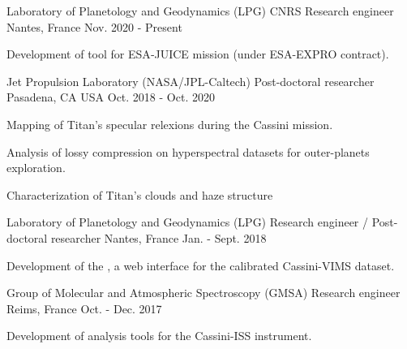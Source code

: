 
\begin{cventries}

  \cventry
  {Laboratory of Planetology and Geodynamics (LPG)}
  {CNRS Research engineer}
  {Nantes, France}
  {Nov. 2020 - Present}
  {
    \begin{cvitems}
      \item{Development of  tool for ESA‑JUICE mission (under ESA-EXPRO contract).}
    \end{cvitems}
    \vspace{1em}
  }

  \cventry
    {Jet Propulsion Laboratory (NASA/JPL-Caltech)}
    {Post-doctoral researcher}
    {Pasadena, CA USA}
    {Oct. 2018 - Oct. 2020}
    {
      \begin{cvitems}
        \item{Mapping of Titan's specular relexions during the Cassini mission.}
        \item{Analysis of lossy compression on hyperspectral datasets for outer-planets exploration.}
        \item{Characterization of Titan's clouds and haze structure}
      \end{cvitems}
      \vspace{1em}
    }

  \cventry
    {Laboratory of Planetology and Geodynamics (LPG)}
    {Research engineer / Post-doctoral researcher}
    {Nantes, France}
    {Jan. - Sept. 2018}
    {
      \begin{cvitems}
        \item{Development of the
        ,
        a web interface for the calibrated Cassini-VIMS dataset.}
      \end{cvitems}
      \vspace{1em}
    }

  \cventry
    {Group of Molecular and Atmospheric Spectroscopy (GMSA)}
    {Research engineer}
    {Reims, France}
    {Oct. - Dec. 2017}
    {
      \begin{cvitems}
        \item{Development of analysis tools for the Cassini-ISS instrument.}
      \end{cvitems}
      \vspace{1em}
    }

\end{cventries}
